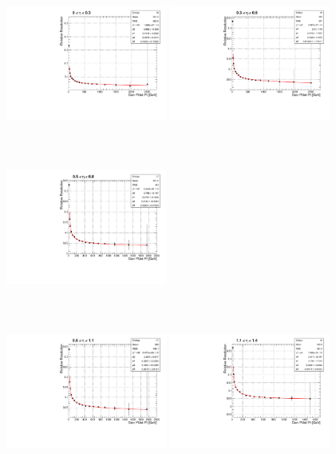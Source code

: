 \begin{figure}[!h]
 \centering
  {\label{fig:fit1a}\includegraphics[width=5.3cm,height=5.3cm]{analysis_figs/eta0.pdf}}
  {\label{fig:fit1b}\includegraphics[width=5.3cm,height=5.3cm]{analysis_figs/eta1.pdf}} 
  {\label{fig:fit1c}\includegraphics[width=5.3cm,height=5.3cm]{analysis_figs/eta2.pdf}} \\
  {\label{fig:fit1d}\includegraphics[width=5.3cm,height=5.3cm]{analysis_figs/eta3.pdf}} 
  {\label{fig:fit1e}\includegraphics[width=5.3cm,height=5.3cm]{analysis_figs/eta4.pdf}}

\end{figure}
